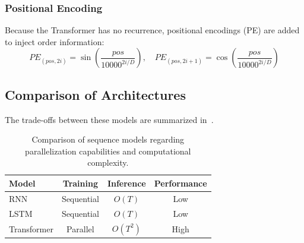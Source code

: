 \subsubsection{Positional Encoding}
Because the Transformer has no recurrence, positional encodings (PE) are added to inject order information:
\begin{equation}
    PE_{(pos, 2i)} = \sin\left(\frac{pos}{10000^{2i/D}}\right), \quad PE_{(pos, 2i+1)} = \cos\left(\frac{pos}{10000^{2i/D}}\right)
\end{equation}

\subsection{Comparison of Architectures}
The trade-offs between these models are summarized in~.

\begin{table}[h!]
    \centering
    \caption{Comparison of sequence models regarding parallelization capabilities and computational complexity.}
    \begin{tabular}{|l|c|c|c|}
    \hline
    \textbf{Model} & \textbf{Training} & \textbf{Inference} & \textbf{Performance} \\ \hline
    RNN & Sequential & $O(T)$ & Low \\ \hline
    LSTM & Sequential & $O(T)$ & Low \\ \hline
    Transformer & Parallel & $O(T^2)$ & High \\ \hline
    \end{tabular}
    \label{tab:model_comparison}
\end{table}